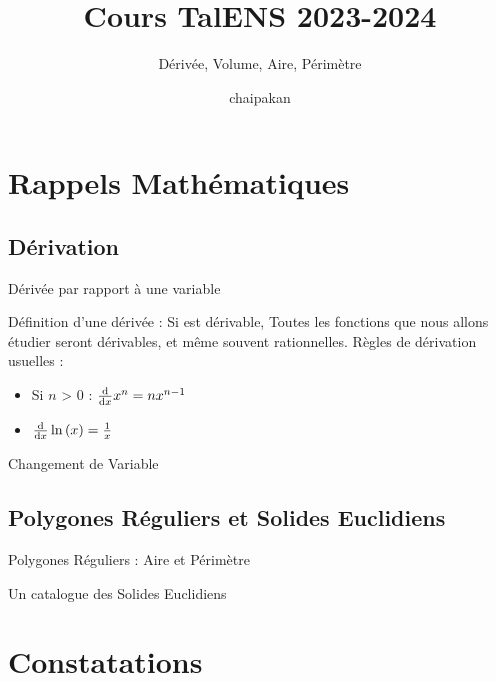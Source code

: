 \documentclass{beamercours}
\title{Cours TalENS 2023-2024}
\subtitle{Dérivée, Volume, Aire, Périmètre}
\date{chaipakan}
\begin{document}
\maketitle

    \section{Rappels Mathématiques}
        \subsection{Dérivation}
            \begin{frame}{Dérivée par rapport à une variable}
                
                Définition d'une dérivée : Si  est dérivable, 
                Toutes les fonctions que nous allons étudier seront dérivables, et même souvent rationnelles.
                Règles de dérivation usuelles : 
                \begin{itemize}
                    \item Si $n$ > 0 : $\frac{\mathrm{d}}{\mathrm{d}x}x^{n} = nx^{n-1}$
                    \item $\frac{\mathrm{d}}{\mathrm{d}x} \ln{(x)} = \frac{1}{x}$
                \end{itemize}
            \end{frame}

            
            \begin{frame}{Changement de Variable}   
                
            \end{frame}

        \subsection{Polygones Réguliers et Solides Euclidiens}
            \begin{frame}{Polygones Réguliers : Aire et Périmètre}
                
            \end{frame}
            \begin{frame}{Un catalogue des Solides Euclidiens}
                
            \end{frame}

    \section{Constatations}
\end{document}
